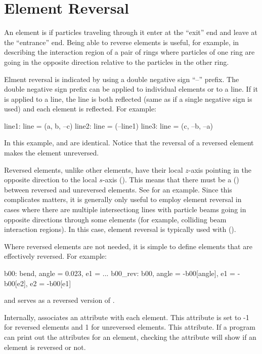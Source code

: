 \section{Element Reversal}
\label{s:ele.reverse}

An element is  if particles traveling through it enter at
the ``exit'' end and leave at the ``entrance'' end. Being able to
reverse elements is useful, for example, in describing the interaction
region of a pair of rings where particles of one ring are going in the
opposite direction relative to the particles in the other ring.

Elment reversal is indicated by using a double negative sign ``--''
prefix. The double negative sign prefix can be applied to individual
elements or to a line. If it is applied to a line, the line is both
reflected (same as if a single negative sign is used) and each element
is reflected. For example:
\begin{example}
  line1: line = (a, b, --c)
  line2: line = (--line1)
  line3: line = (c, --b, --a)
\end{example}
In this example,  and  are identical. Notice that
the reversal of a reversed element makes the element unreversed.

Reversed elements, unlike other elements, have their local $z$-axis pointing in the
opposite direction to the local $s$-axis (). This means that there
must be a  () between reversed and unreversed
elements. See  for an example. Since this complicates matters, it is
generally only useful to employ element reversal in cases where there are multiple
intersectiong lines with particle beams going in opposite directions through some elements
(for example, colliding beam interaction regions). In this case, element reversal is
typically used with  ().

Where reversed elements are not needed, it is simple to define elements that are
effectively reversed. For example:
\begin{example}
  b00: bend, angle = 0.023, e1 = ...
  b00_rev: b00, angle = -b00[angle], e1 = -b00[e2], e2 = -b00[e1]
\end{example}
and  serves as a reversed version of .

Internally, \bmad associates an  attribute with each element. This
attribute is set to -1 for reversed elements and 1 for unreversed elements. This
attribute. If a program can print out the attributes for an element, checking the
 attribute will show if an element is reversed or not.

